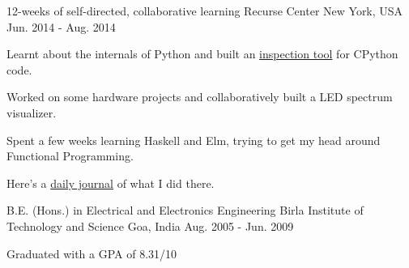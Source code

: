 

\begin{cventries}

  \cventry
      {12-weeks of self-directed, collaborative learning}
      {Recurse Center}
      {New York, USA} %
      {Jun. 2014 - Aug. 2014} %
      {
        \begin{cvitems} %
        \item {Learnt about the internals of Python and built an \href{https://github.com/punchagan/cinspect}{inspection tool} for CPython code.}
        \item {Worked on some hardware projects and collaboratively built a LED spectrum visualizer.}
        \item {Spent a few weeks learning Haskell and Elm, trying to get my head around Functional Programming.}
        \item {Here’s a \href{https://punchagan.muse-amuse.in/recurse-center/}{daily journal} of what I did there.}
        \end{cvitems}
      }
  \cventry
      {B.E. (Hons.) in Electrical and Electronics Engineering} %
      {Birla Institute of Technology and Science} %
      {Goa, India} %
      {Aug. 2005 - Jun. 2009} %
      {
        \begin{cvitems} %
        \item {Graduated with a GPA of 8.31/10}
        \end{cvitems}
      }
\end{cventries}
